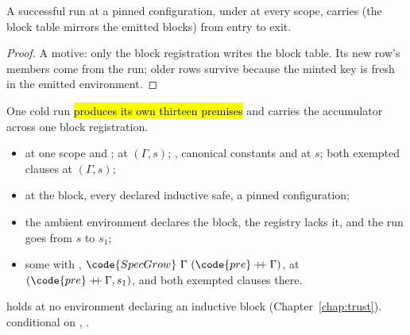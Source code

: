 \begin{lemma}
\label{lem:indBlocksCover_of_run}
\leanok
{}
 A successful  run at a pinned configuration, under  at
every scope, carries  (the block table mirrors the emitted blocks) from entry to exit.
\end{lemma}
\begin{proof}
\leanok
{}
 A  motive: only the block registration writes the block table. Its new
row's members come from the run; older rows survive because the minted key is fresh in the emitted
environment.
\end{proof}
\begin{theorem}
\label{thm:regInv_registerInd_run}
\leanok
{}
 One cold  run \hl{produces its own thirteen premises} and
carries the accumulator across one block registration.
\begin{itemize}
\item {}  at one scope and ;  at $(\Gamma, s)$;
, canonical constants and  at $s$; both exempted clauses at
$(\Gamma, s)$;
\item {} at the block, every declared inductive safe, a pinned configuration;
\item the ambient environment declares the block, the registry lacks it, and the run goes from $s$ to $s_1$;
\item {} some  with , $\code{SpecGrow}\ \Gamma\ (\code{pre}
\mathbin{+\!\!+} \Gamma)$,  at $(\code{pre} \mathbin{+\!\!+} \Gamma, s_1)$, and both exempted
clauses there.
\end{itemize}
  holds at no environment declaring an inductive block
(Chapter~\ref{chap:trust}).
 \stProved{} conditional on \stAssumed{} , .
\end{theorem}
